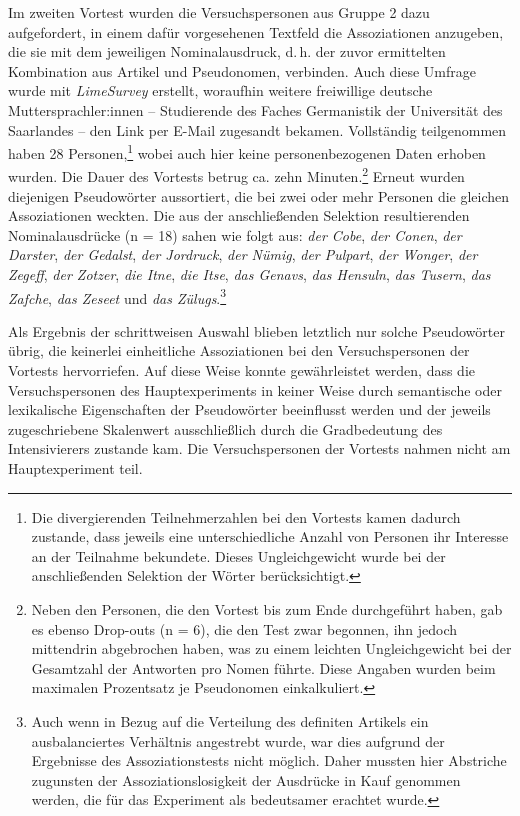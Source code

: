 Im zweiten Vortest wurden die Versuchspersonen aus Gruppe 2 dazu aufgefordert, in einem dafür vorgesehenen Textfeld die Assoziationen anzugeben, die sie mit dem jeweiligen Nominalausdruck, d.\,h. der zuvor ermittelten Kombination aus Artikel und Pseudonomen, verbinden. Auch diese Umfrage wurde mit \textit{LimeSurvey} erstellt, woraufhin weitere freiwillige deutsche Muttersprachler:innen -- Studierende des Faches Germanistik der Universität des Saarlandes -- den Link per E-Mail zugesandt bekamen. Vollständig teilgenommen haben 28 Personen,\footnote{Die divergierenden Teilnehmerzahlen bei den Vortests kamen dadurch zustande, dass jeweils eine unterschiedliche Anzahl von Personen ihr Interesse an der Teilnahme bekundete. Dieses Ungleichgewicht wurde bei der anschließenden Selektion der Wörter berücksichtigt.} wobei auch hier keine personenbezogenen Daten erhoben wurden. Die Dauer des Vortests betrug ca. zehn Minuten.\footnote{Neben den Personen, die den Vortest bis zum Ende durchgeführt haben, gab es ebenso Drop-outs (n = 6), die den Test zwar begonnen, ihn jedoch mittendrin abgebrochen haben, was zu einem leichten Ungleichgewicht bei der Gesamtzahl der Antworten pro Nomen führte. Diese Angaben wurden beim maximalen Prozentsatz je Pseudonomen einkalkuliert.} Erneut wurden diejenigen Pseudowörter aussortiert, die bei zwei oder mehr Personen die gleichen Assoziationen weckten. Die aus der anschließenden Selektion resultierenden Nominalausdrücke (n = 18) sahen wie folgt aus: \textit{der Cobe}, \textit{der Conen}, \textit{der Darster}, \textit{der Gedalst}, \textit{der Jordruck}, \textit{der Nümig}, \textit{der Pulpart}, \textit{der Wonger}, \textit{der Zegeff}, \textit{der Zotzer}, \textit{die Itne}, \textit{die Itse}, \textit{das Genavs}, \textit{das Hensuln}, \textit{das Tusern}, \textit{das Zafche}, \textit{das Zeseet} und \textit{das Zülugs}.\footnote{Auch wenn in Bezug auf die Verteilung des definiten Artikels ein ausbalanciertes Verhältnis angestrebt wurde, war dies aufgrund der Ergebnisse des Assoziationstests nicht möglich. Daher mussten hier Abstriche zugunsten der Assoziationslosigkeit der Ausdrücke in Kauf genommen werden, die für das Experiment als bedeutsamer erachtet wurde.}




Als Ergebnis der schrittweisen Auswahl blieben letztlich nur solche Pseudowörter übrig, die keinerlei einheitliche Assoziationen bei den Versuchspersonen der Vortests hervorriefen. Auf diese Weise konnte gewährleistet werden, dass die Versuchspersonen des Hauptexperiments in keiner Weise durch semantische oder lexikalische Eigenschaften der Pseudowörter beeinflusst werden und der jeweils zugeschriebene Skalenwert ausschließlich durch die Gradbedeutung des Intensivierers zustande kam. Die Versuchspersonen der Vortests nahmen nicht am Hauptexperiment teil.


